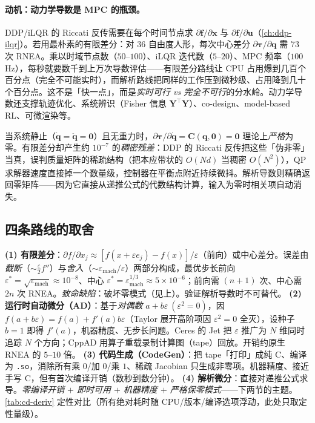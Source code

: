 \paragraph{动机：动力学导数是 MPC 的瓶颈。}
DDP/iLQR 的 Riccati 反传需要在每个时间节点求 $\partial\mathbf f/\partial\mathbf x$ 与 $\partial\mathbf f/\partial\mathbf u$（\cref{ch:ddp-ilqr}）。若用最朴素的有限差分：对 $36$ 自由度人形，每次中心差分 $\partial\boldsymbol\tau/\partial\mathbf q$ 需 $73$ 次 RNEA。乘以时域节点数（$50$–$100$）、iLQR 迭代数（$5$–$20$）、MPC 频率（$100$\,Hz），每秒就要数千到上万次导数评估——有限差分路线让 CPU 占用爆到几百个百分点（完全不可能实时），而解析路线把同样的工作压到微秒级、占用降到几十个百分点。这不是「快一点」，而是\emph{实时可行 vs 完全不可行}的分水岭。动力学导数还支撑轨迹优化、系统辨识（Fisher 信息 $\mathbf Y^\top\mathbf Y$）、co-design、model-based RL、可微渲染等。

\begin{insight}
当系统静止（$\dot{\mathbf q}=\ddot{\mathbf q}=\mathbf 0$）且无重力时，$\partial\boldsymbol\tau/\partial\dot{\mathbf q}=\mathbf C(\mathbf q,\mathbf 0)=\mathbf 0$ 理论上\emph{严格}为零。有限差分却产生约 $10^{-7}$ 的\emph{稠密残差}：DDP 的 Riccati 反传把这些「伪非零」当真，误判质量矩阵的稀疏结构（把本应带状的 $O(Nd)$ 当稠密 $O(N^2)$），QP 求解器速度直接掉一个数量级，控制器在平衡点附近持续微抖。解析导数则精确返回零矩阵——因为它直接从递推公式的代数结构计算，输入为零时相关项自动消失。
\end{insight}

\subsection{四条路线的取舍}
\textbf{(1) 有限差分}：$\partial f/\partial x_j\approx[f(x+\varepsilon e_j)-f(x)]/\varepsilon$（前向）或中心差分。误差由\emph{截断}（$\sim\tfrac\varepsilon2 f''$）与\emph{舍入}（$\sim\varepsilon_{\text{mach}}/\varepsilon$）两部分构成，最优步长前向 $\varepsilon^*=\sqrt{\varepsilon_{\text{mach}}}\approx10^{-8}$、中心 $\varepsilon^*=\varepsilon_{\text{mach}}^{1/3}\approx5\times10^{-6}$；前向需 $(n{+}1)$ 次、中心需 $2n$ 次 RNEA。\emph{致命缺陷}：破坏零模式（见上）。验证解析导数时不可替代。\;
\textbf{(2) 运行时自动微分（AD）}：基于\emph{对偶数} $a+b\varepsilon\ (\varepsilon^2=0)$，因 $f(a+b\varepsilon)=f(a)+f'(a)b\varepsilon$（Taylor 展开高阶项因 $\varepsilon^2=0$ 全灭），设种子 $b=1$ 即得 $f'(a)$，机器精度、无步长问题。Ceres 的 Jet 把 $\varepsilon$ 推广为 $N$ 维同时追踪 $N$ 个方向；CppAD 用算子重载录制计算图（tape）回放。开销约原生 RNEA 的 $5$–$10$ 倍。\;
\textbf{(3) 代码生成（CodeGen）}：把 tape「打印」成纯 C、编译为 \texttt{.so}，消除所有乘 $0$/加 $0$/乘 $1$、稀疏 Jacobian 只生成非零项。机器精度、接近手写 C，但有首次编译开销（数秒到数分钟）。\;
\textbf{(4) 解析微分}：直接对递推公式求导。\emph{零编译开销 $+$ 即时可用 $+$ 机器精度 $+$ 严格保零模式}——下两节的主题。\cref{tab:cd-deriv} 定性对比（所有绝对耗时随 CPU/版本/编译选项浮动，此处只取定性量级）。

